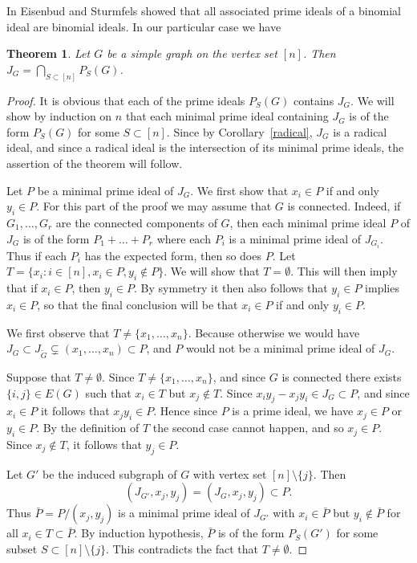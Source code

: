 \documentclass[11pt]{amsart}
\let\Sect=\bigcap
\let\:=\colon
\newtheorem{Theorem}{Theorem}[section]
\begin{document}
In \cite{ES} Eisenbud and Sturmfels showed that all associated prime ideals of a binomial ideal are binomial ideals. In our particular case we have

\begin{Theorem}
\label{intersection}
Let $G$ be a simple graph on the vertex set $[n]$. Then $J_G=\Sect_{S\subset [n]}P_S(G)$.
\end{Theorem}

\begin{proof}
It is obvious that each of the prime ideals $P_S(G)$ contains $J_G$.
We will show by induction on $n$ that each minimal prime ideal containing $J_G$ is of the form $P_S(G)$ for some $S\subset [n]$. Since by Corollary~\ref{radical},  $J_G$ is a radical ideal, and since a radical ideal is the intersection of its minimal prime ideals, the assertion of the theorem will follow.

Let $P$ be a minimal prime ideal of $J_G$. We first show that $x_i\in P$  if and only $y_i\in P$. For this part of the proof we may
assume that $G$ is connected. Indeed,  if $G_1,\ldots, G_r$ are the connected components of $G$, then each minimal prime ideal $P$ of $J_G$ is of the form $P_1+\ldots +P_r$ where each $P_i$ is a minimal prime ideal of $J_{G_i}$. Thus if each $P_i$ has the expected form, then so does $P$.
Let $T=\{x_{i}\: i\in [n], x_i\in P, y_i\not\in P\}$.  We will show that $T=\emptyset$. This will then imply that if $x_i\in P$, then $y_i\in P$. By symmetry it then also follows that $y_i\in P$ implies $x_i\in P$, so that the final conclusion will be that $x_i\in P$ if and only $y_i\in P$.

We first observe that $T\neq \{x_1,\ldots,x_n\}$. Because otherwise we would have  $J_G\subset J_{\tilde{G}}\subsetneq (x_1,\ldots,x_n)\subset P$, and $P$ would not be a minimal prime ideal of $J_G$.

Suppose that $T\neq \emptyset$. Since $T\neq\{x_1,\ldots,x_n\}$, and since $G$ is connected there exists $\{i,j\}\in E(G)$ such that $x_i\in T$ but $x_j\not\in T$. Since $x_iy_j-x_jy_i\in J_G\subset P$, and since $x_i\in P$ it follows that $x_jy_i\in P$.  Hence since $P$ is a prime ideal, we have $x_j\in P$ or $y_i\in P$. By the definition of $T$ the second case cannot happen, and so $x_j\in P$. Since $x_j\not\in T$,  it follows that $y_j\in P$.

Let $G'$ be the induced subgraph of $G$ with  vertex set  $[n]\setminus \{j\}$. Then
\[
(J_{G'},x_j,y_j)=(J_G, x_j, y_j)\subset P.
\]
Thus $\bar{P}=P/(x_j,y_j)$ is a minimal prime ideal of $J_{G'}$ with $x_i\in \bar{P}$ but $y_i\not \in \bar{P}$ for all $x_i\in T\subset \bar{P}$.  By induction hypothesis, $\bar{P}$ is of the form $P_S(G')$ for some subset $S\subset [n]\setminus\{j\}$. This contradicts the fact that $T\neq \emptyset$.



\end{proof}
\end{document}
